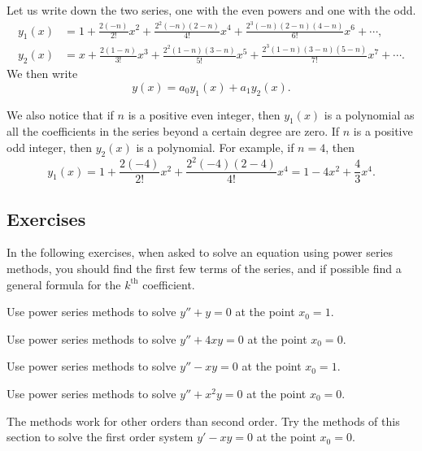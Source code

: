 \begin{example}
Let us write down the two series, one with the even powers and one with the
odd.
\begin{align*}
y_1(x) & = 
1+\frac{2(-n)}{2!} x^2 + \frac{2^2(-n)(2-n)}{4!} x^4 + 
\frac{2^3(-n)(2-n)(4-n)}{6!} x^6 + \cdots ,
\\
y_2(x) & = 
x+\frac{2(1-n)}{3!} x^3 + \frac{2^2(1-n)(3-n)}{5!} x^5 + 
\frac{2^3(1-n)(3-n)(5-n)}{7!} x^7 + \cdots .
\end{align*}
We then write
\begin{equation*}
y(x) = a_0 y_1(x) + a_1 y_2(x) .
\end{equation*}

We also notice that if $n$ is a positive even integer, then $y_1(x)$ is a
polynomial as all the coefficients in the series beyond a certain
degree are zero.  If $n$ is a positive odd integer, then $y_2(x)$ is
a polynomial.  For example, if $n=4$, then
\begin{equation*}
y_1(x) = 1 + \frac{2(-4)}{2!} x^2 + \frac{2^2(-4)(2-4)}{4!} x^4
= 1 - 4x^2 + \frac{4}{3} x^4 .
\end{equation*}
\end{example}

\subsection{Exercises}

In the following exercises, when asked to solve an equation using power
series methods, you should find the first few terms of the series,
and if possible find a general formula for the $k^{\text{th}}$ coefficient.

\begin{exercise}
Use power series methods to solve $y''+y = 0$ at the point $x_0 = 1$.
\end{exercise}

\begin{exercise}
Use power series methods to solve $y''+4xy = 0$ at the point $x_0 = 0$.
\end{exercise}

\begin{exercise}
Use power series methods to solve $y''-xy = 0$ at the point $x_0 = 1$.
\end{exercise}

\begin{exercise}
Use power series methods to solve $y''+x^2y = 0$ at the point $x_0 = 0$.
\end{exercise}

\begin{exercise}
The methods work for other orders than second order.  Try the methods
of this section to solve the first order system $y'-xy = 0$ at
the point $x_0 = 0$.
\end{exercise}

